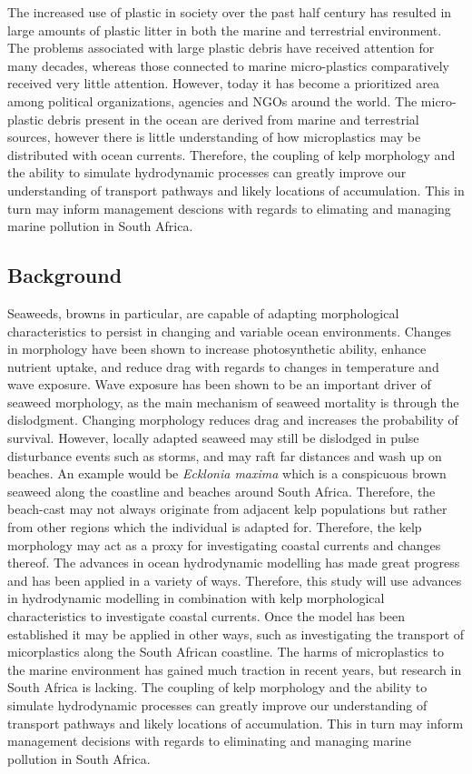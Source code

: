 \documentclass[]{article}
\begin{document}
The increased use of plastic in society over the past half century has
resulted in large amounts of plastic litter in both the marine and
terrestrial environment. The problems associated with large plastic
debris have received attention for many decades, whereas those connected
to marine micro-plastics comparatively received very little attention.
However, today it has become a prioritized area among political
organizations, agencies and NGOs around the world. The micro-plastic
debris present in the ocean are derived from marine and terrestrial
sources, however there is little understanding of how microplastics may
be distributed with ocean currents. Therefore, the coupling of kelp
morphology and the ability to simulate hydrodynamic processes can
greatly improve our understanding of transport pathways and likely
locations of accumulation. This in turn may inform management descions
with regards to elimating and managing marine pollution in South Africa.

\subsection{Background}\label{background}

Seaweeds, browns in particular, are capable of adapting morphological
characteristics to persist in changing and variable ocean environments.
Changes in morphology have been shown to increase photosynthetic
ability, enhance nutrient uptake, and reduce drag with regards to
changes in temperature and wave exposure. Wave exposure has been shown
to be an important driver of seaweed morphology, as the main mechanism
of seaweed mortality is through the dislodgment. Changing morphology
reduces drag and increases the probability of survival. However, locally
adapted seaweed may still be dislodged in pulse disturbance events such
as storms, and may raft far distances and wash up on beaches. An example
would be \emph{Ecklonia maxima} which is a conspicuous brown seaweed
along the coastline and beaches around South Africa. Therefore, the
beach-cast may not always originate from adjacent kelp populations but
rather from other regions which the individual is adapted for.
Therefore, the kelp morphology may act as a proxy for investigating
coastal currents and changes thereof. The advances in ocean hydrodynamic
modelling has made great progress and has been applied in a variety of
ways. Therefore, this study will use advances in hydrodynamic modelling
in combination with kelp morphological characteristics to investigate
coastal currents. Once the model has been established it may be applied
in other ways, such as investigating the transport of micorplastics
along the South African coastline. The harms of microplastics to the
marine environment has gained much traction in recent years, but
research in South Africa is lacking. The coupling of kelp morphology and
the ability to simulate hydrodynamic processes can greatly improve our
understanding of transport pathways and likely locations of
accumulation. This in turn may inform management decisions with regards
to eliminating and managing marine pollution in South Africa.
\end{document}
